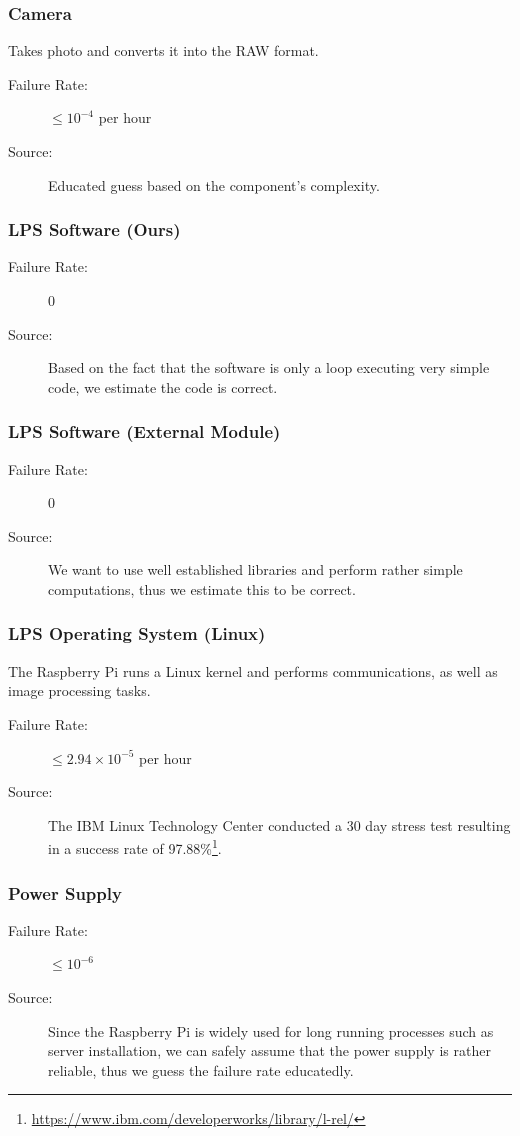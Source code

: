 \documentclass[a4paper,parskip,headheight=38pt]{scrartcl} %
\begin{document}
\subsubsection{Camera}
Takes photo and converts it into the RAW format.
\begin{description}
\item[Failure Rate:] $\leq 10^{-4}$ per hour
\item[Source:] Educated guess based on the component's complexity.
\end{description}

\subsubsection{LPS Software (Ours)}
\begin{description}
\item[Failure Rate:] $0$
\item[Source:] Based on the fact that the software is only a loop
executing very simple code, we estimate the code is correct.
\end{description}

\subsubsection{LPS Software (External Module)}
\begin{description}
\item[Failure Rate:] $0$
\item[Source:] We want to use well established libraries and perform rather simple computations, thus we estimate this to be correct.
\end{description}

\subsubsection{LPS Operating System (Linux)}
The Raspberry Pi runs a Linux kernel and performs communications, as well as image processing tasks.
\begin{description}
\item[Failure Rate:] $\leq 2.94 \times 10^{-5}$ per hour
\item[Source:] The IBM Linux Technology Center conducted a 30 day stress test resulting in a success rate of 97.88\%\footnote{\url{https://www.ibm.com/developerworks/library/l-rel/}}.
\end{description}

\subsubsection{Power Supply}
\begin{description}
\item[Failure Rate:] $\leq 10^{-6}$
\item[Source:] Since the Raspberry Pi is widely used for long running processes such as server installation, we can safely assume that the power supply is rather reliable, thus we guess the failure rate educatedly.
\end{description}
\end{document}
